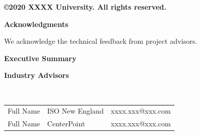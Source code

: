 \documentclass[letterpaper, 12pt, oneside]{book}
\theoremstyle{plain}
\theoremstyle{definition}
\theoremstyle{remark}
\begin{document}
\vspace{50pt}
\begin{center}
\textbf{\copyright  2020 XXXX University. All rights reserved.} 
\end{center}

\newpage
{} %
\begin{large}
\begin{center}
\textbf{Acknowledgments} 
\end{center}
\end{large}

We acknowledge the technical feedback from project advisors. 

\lipsum[3]

\newpage

\begin{large}
\begin{center}
\textbf{Executive Summary} 
\end{center}
\end{large}

\begin{spacing}{1.3}

\lipsum[5]


\newpage
\begin{large}
\textbf{Industry Advisors} 
\end{large}$\quad$

\begin{table}[h]
	\centering

	\begin{tabular}{lll}
Full Name & ISO New England & xxxx.xxx@xxx.com \\
Full Name & CenterPoint & xxxx.xxx@xxx.com \\
\end{tabular}
\end{table}


\end{spacing}
\end{document}

